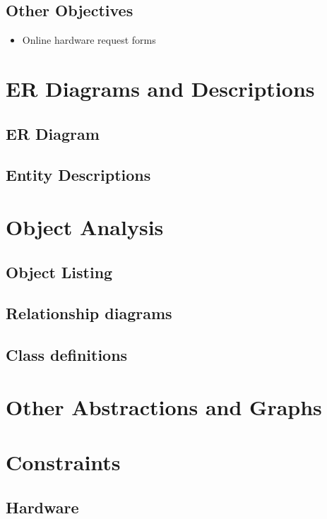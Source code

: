 \subsection{Other Objectives}

\begin{itemize}
\item Online hardware request forms
\end{itemize}

\section{ER Diagrams and Descriptions}

\subsection{ER Diagram}

\subsection{Entity Descriptions}

\section{Object Analysis}

\subsection{Object Listing}

\subsection{Relationship diagrams}

\subsection{Class definitions}

\section{Other Abstractions and Graphs}

\section{Constraints}

\subsection{Hardware}

